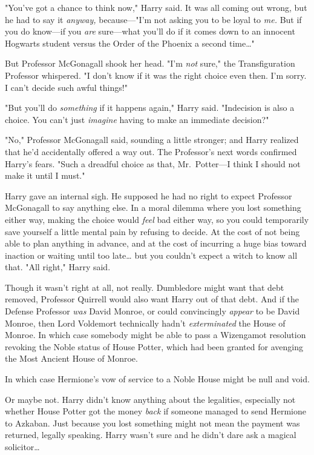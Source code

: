 "You've got a chance to think now," Harry said. It was all coming out wrong,
but he had to say it \emph{anyway,} because---"I'm not asking you to be loyal
to \emph{me.} But if you do know---if you \emph{are} sure---what you'll do if
it comes down to an innocent Hogwarts student versus the Order of the Phoenix a
second time{\ldots}"

But Professor McGonagall shook her head. "I'm \emph{not} sure," the
Transfiguration Professor whispered. "I don't know if it was the right choice
even then. I'm sorry. I can't decide such awful things!"

"But you'll do \emph{something} if it happens again," Harry said. "Indecision
is also a choice. You can't just \emph{imagine} having to make an immediate
decision?"

"No," Professor McGonagall said, sounding a little stronger; and Harry realized
that he'd accidentally offered a way out. The Professor's next words confirmed
Harry's fears. "Such a dreadful choice as that, Mr.~Potter---I think I should
not make it until I must."

Harry gave an internal sigh. He supposed he had no right to expect Professor
McGonagall to say anything else. In a moral dilemma where you lost something
either way, making the choice would \emph{feel} bad either way, so you could
temporarily save yourself a little mental pain by refusing to decide. At the
cost of not being able to plan anything in advance, and at the cost of
incurring a huge bias toward inaction or waiting until too late{\ldots} but you
couldn't expect a witch to know all that. "All right," Harry said.

Though it wasn't right at all, not really. Dumbledore might want that debt
removed, Professor Quirrell would also want Harry out of that debt. And if the
Defense Professor \emph{was} David Monroe, or could convincingly \emph{appear}
to be David Monroe, then Lord Voldemort technically hadn't \emph{exterminated}
the House of Monroe. In which case somebody might be able to pass a Wizengamot
resolution revoking the Noble status of House Potter, which had been granted
for avenging the Most Ancient House of Monroe.

In which case Hermione's vow of service to a Noble House might be null and void.

Or maybe not. Harry didn't know anything about the legalities, especially not
whether House Potter got the money \emph{back} if someone managed to send
Hermione to Azkaban. Just because you lost something might not mean the payment
was returned, legally speaking. Harry wasn't sure and he didn't dare ask a
magical solicitor{\ldots}

